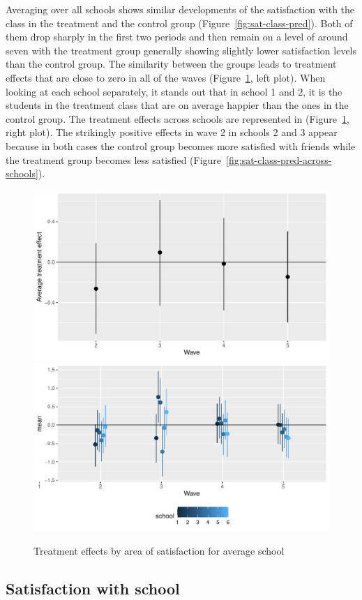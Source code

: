 \documentclass[a4, 12pt]{article}
\begin{document}
\label{sec:results-class}
Averaging over all schools shows similar developments of the satisfaction with the class in the treatment and the control group (Figure~\ref{fig:sat-class-pred}). Both of them drop sharply in the first two periods and then remain on a level of around seven with the treatment group generally showing slightly lower satisfaction levels than the control group. The similarity between the groups leads to treatment effects that are close to zero in all of the waves (Figure~\ref{fig:class}, left plot).
When looking at each school separately, it stands out that in school 1 and 2, it is the students in the treatment class that are on average happier than the ones in the control group. The treatment effects across schools are represented in (Figure~\ref{fig:class}, right plot). The strikingly positive effects in wave 2 in schools 2 and 3 appear because in both cases the control group becomes more satisfied with friends while the treatment group becomes less satisfied (Figure~\ref{fig:sat-class-pred-across-schools}).

\begin{figure}[H]
\includegraphics[width=0.5\linewidth,]{../figures/sat_class_teff} \includegraphics[width=0.5\linewidth,]{../figures/sat_class_teff_across_schools} \caption{Treatment effects by area of satisfaction for average school}\label{fig:class}
\end{figure}

\hypertarget{satisfaction-with-school}{%
\subsection{Satisfaction with school}\label{satisfaction-with-school}}
\end{document}
